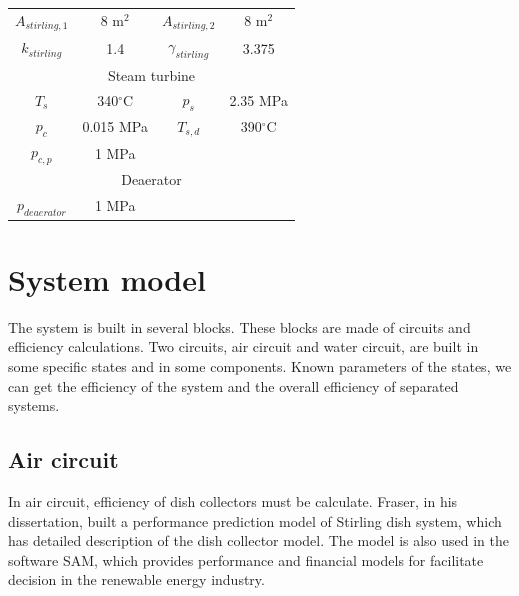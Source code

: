 \documentclass{article}
\begin{document}
\begin{table}[htbp]
\begin{center}
\begin{tabular}{cccc}
		$A_{stirling,1}$\nomenclature{$A_{stirling,1}$}{Heat transfer area of Stirling engine at air side} & 8 m$^2$ & $A_{stirling,2}$\nomenclature{$A_{stirling,2}$}{Heat transfer area of Stirling engine at water side} & 8 m$^2$\\
		$k_{stirling}$\nomenclature{$k_{stirling}$}{Specific heat ratio of the working gas in Stirling engine} & 1.4 & $\gamma_{stirling}$\nomenclature[G]{$\gamma_{stirling}$}{Compression ratio of Stirling engine} & 3.375\\
		\midrule
		\multicolumn{4}{c}{Steam turbine}\\
		\midrule
		$T_s$\nomenclature{$T_s$}{Main steam temperature of turbine} & 340$^\circ$C & $p_s$\nomenclature{$p_s$}{Main steam pressure of turbine} & 2.35 MPa\\
		$p_c$\nomenclature{$p_c$}{Exhaust pressure of turbine} & 0.015 MPa & $T_{s,d}$\nomenclature{$T_{s,d}$}{Designed mean steam temperature of turbine} & 390$^\circ$C\\
		$p_{c,p}$\nomenclature{$p_{cp}$}{Water pressure after condensate pump} & 1 MPa\\
		\midrule
		\multicolumn{4}{c}{Deaerator}\\
		\midrule
		$p_{deaerator}$\nomenclature{$p_{deaerator}$}{Outlet pressure of deaerator} & 1 MPa\\
		\bottomrule
	\end{tabular}
	\end{center}
	\label{tab:system-data}
\end{table}

\section{System model}
The system is built in several blocks. These blocks are made of circuits and efficiency calculations. Two circuits, air circuit and water circuit, are built in some specific states and in some components. Known parameters of the states, we can get the efficiency of the system and the overall efficiency of separated systems.

\subsection{Air circuit}
In air circuit, efficiency of dish collectors must be calculate. Fraser, in his dissertation\cite{Fraser2008}, built a performance prediction model of Stirling dish system, which has detailed description of the dish collector model. The model is also used in the software SAM, which provides performance and financial models for facilitate decision in the renewable energy industry.
\end{document}
